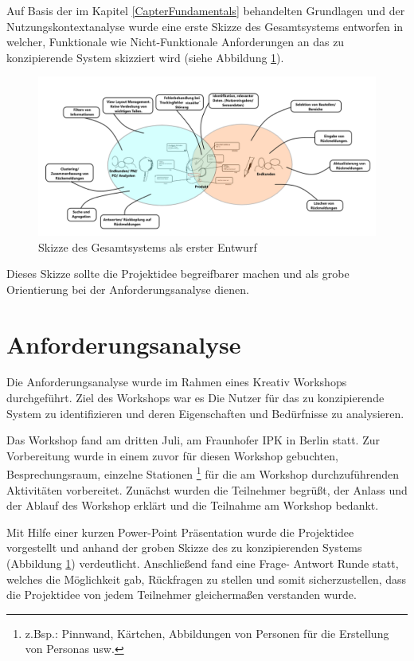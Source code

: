 Auf Basis der im Kapitel \ref{CapterFundamentals} behandelten Grundlagen und der Nutzungskontextanalyse wurde eine erste Skizze des Gesamtsystems entworfen in welcher, 
Funktionale wie Nicht-Funktionale Anforderungen an das zu konzipierende System skizziert wird (siehe Abbildung \ref{img:sysstem_sketch}).

\begin{figure}[H]
	\centering
	\includegraphics[width=1.0\textwidth]{resources/conception/skizze_gesamtsystem.png}
	\caption{Skizze des Gesamtsystems als erster Entwurf \cite{system sketch}}
	\label{img:sysstem_sketch}
\end{figure}

Dieses Skizze sollte die Projektidee begreifbarer machen und als grobe Orientierung bei der Anforderungsanalyse dienen.

\section{Anforderungsanalyse}

Die Anforderungsanalyse wurde im Rahmen eines Kreativ Workshops durchgeführt. Ziel des Workshops war es Die Nutzer für das zu konzipierende System zu identifizieren und deren Eigenschaften und Bedürfnisse 
zu analysieren. 

Das Workshop fand am dritten Juli, am Fraunhofer IPK in Berlin statt. Zur Vorbereitung wurde in einem zuvor für diesen Workshop gebuchten, Besprechungsraum, einzelne Stationen \footnote{z.Bsp.: Pinnwand, Kärtchen, Abbildungen von Personen für die Erstellung von Personas usw.} für die am Workshop durchzuführenden Aktivitäten vorbereitet. 
Zunächst wurden die Teilnehmer begrüßt, der Anlass und der Ablauf des Workshop erklärt und die Teilnahme am Workshop bedankt. 

Mit Hilfe einer kurzen Power-Point Präsentation wurde die Projektidee vorgestellt und anhand der groben Skizze des zu konzipierenden Systems (Abbildung \ref{img:sysstem_sketch}) verdeutlicht. 
Anschließend fand eine Frage- Antwort Runde statt, welches die Möglichkeit gab, Rückfragen zu stellen und somit sicherzustellen, dass die Projektidee von jedem Teilnehmer gleichermaßen verstanden wurde. 

